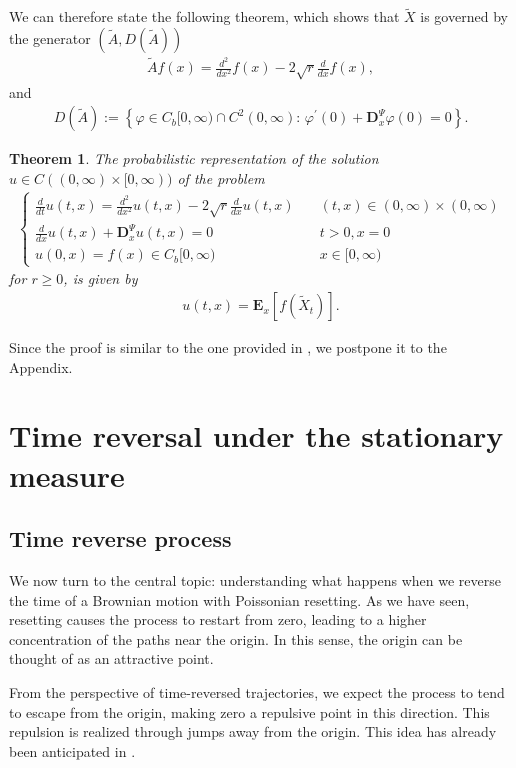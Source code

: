 \documentclass[11pt,a4paper]{article}
\newtheorem{theorem}{Theorem}
\theoremstyle{definition}
\theoremstyle{remark}
\begin{document}
We can therefore state the following theorem, which shows that \(\widetilde{X}\) is governed by the generator \( (\widetilde{A}, {D}(\widetilde{A})) \)
\begin{align*}
	\widetilde{A}f(x) = \frac{d^2}{dx^2} f(x) - 2\sqrt{r} \frac{d}{dx} f(x),
\end{align*}
and
\begin{align*}
	{D}(\widetilde{A}) := \left\{ \varphi \in C_b[0,\infty) \cap C^2(0,\infty): \, \varphi^\prime(0) + \mathbf{D}_x^\Psi \varphi(0) = 0 \right\}.
\end{align*}
\begin{theorem}
	\label{NLBVP}
	The probabilistic representation of the solution $u \in C((0,\infty) \times [0,\infty))$ of the problem
	\begin{align}
		\tag{NLBVP}
		\label{eq:NLBVP}
		\begin{cases}
			\frac{d}{d t} u(t,x)=\frac{d^2}{dx^2} u(t,x) -2\sqrt{r} \frac{d}{dx} u(t,x) \quad &(t,x) \in (0,\infty) \times (0,\infty) \\
			\frac{d}{dx} u(t,x) + \mathbf{D}^\Psi_x u(t,x)=0 \quad    &t>0, x=0\\
			u(0,x) =f(x) \in C_b[0,\infty) \quad &x \in [0,\infty)
		\end{cases}
	\end{align}
	for $r\geq 0$, is given by
	\begin{align*}
		u(t,x)=\mathbf{E}_x[f (\widetilde{X}_t)].
	\end{align*}
\end{theorem}
\noindent
Since the proof is similar to the one provided in \cite[Section 15]{ItoMckean}, we postpone it to the Appendix.
\section{Time reversal under the stationary measure}
\label{sec:stationary}
\subsection{Time reverse process}
We now turn to the central topic: understanding what happens when we reverse the time of a Brownian motion with Poissonian resetting. As we have seen, resetting causes the process to restart from zero, leading to a higher concentration of the paths near the origin. In this sense, the origin can be thought of as an attractive point.

From the perspective of time-reversed trajectories, we expect the process to tend to escape from the origin, making zero a repulsive point in this direction. This repulsion is realized through jumps away from the origin. This idea has already been anticipated in \cite{boncoldovpag2024}.
\end{document}
